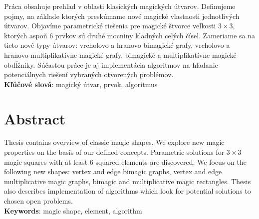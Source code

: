 \documentclass[12pt, oneside]{book}  %
\begin{document}
Práca obsahuje prehľad v oblasti klasických magických útvarov. Definujeme pojmy, na základe ktorých preskúmame nové magické vlastnosti jednotlivých útvarov. Objavíme parametrické riešenia pre magické štvorce veľkosti $3 \times 3$, ktorých aspoň $6$ prvkov sú druhé mocniny kladných celých čísel. Zameriame sa na tieto nové typy útvarov: vrcholovo a hranovo bimagické grafy, vrcholovo a hranovo multiplikatívne magické grafy, bimagické a multiplikatívne magické obdĺžniky. Súčasťou práce je aj implementácia algoritmov na hľadanie potenciálnych riešení vybraných otvorených problémov. \\

\textbf{Kľúčové slová}: magický útvar, prvok, algoritmus


\newpage 
\section*{Abstract}

Thesis contains overview of classic magic shapes. We explore new magic properties on the basis of our defined concepts. Parametric solutions for $3 \times 3$ magic squares with at least $6$ squared elements are discovered. We focus on the following new shapes: vertex and edge bimagic graphs, vertex and edge multiplicative magic graphs, bimagic and multiplicative magic rectangles. Thesis also describes implementation of algorithms which look for potential solutions to chosen open problems. \\

\textbf{Keywords}: magic shape, element, algorithm


%
%


\end{document}
